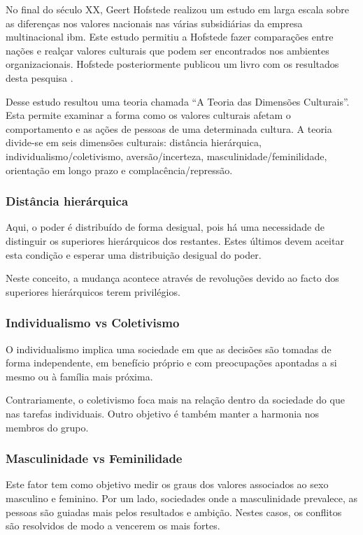 No final do século XX, Geert Hofstede realizou um estudo em larga escala sobre as diferenças nos valores nacionais nas várias subsidiárias da empresa multinacional \acrfull{ibm}. Este estudo permitiu a Hofstede fazer comparações entre nações e realçar valores culturais que podem ser encontrados nos ambientes organizacionais. Hofstede posteriormente publicou um livro com os resultados desta pesquisa  \parencite{Hofstede_1981}.
 
Desse estudo resultou uma teoria chamada “A Teoria das Dimensões Culturais”. Esta permite examinar a forma como os valores culturais afetam o comportamento e as ações de pessoas de uma determinada cultura. A teoria divide-se em seis dimensões culturais: distância hierárquica, individualismo/coletivismo, aversão/incerteza, masculinidade/feminilidade, orientação em longo prazo e complacência/repressão.

\subsubsection{Distância hierárquica}

Aqui, o poder é distribuído de forma desigual, pois há uma necessidade de distinguir os superiores hierárquicos dos restantes. Estes últimos devem aceitar esta condição e esperar uma distribuição desigual do poder.

Neste conceito, a mudança acontece através de revoluções devido ao facto dos superiores hierárquicos terem privilégios.

\subsubsection{Individualismo vs Coletivismo}

O individualismo implica uma sociedade em que as decisões são tomadas de forma independente, em benefício próprio e com preocupações apontadas a si mesmo ou à família mais próxima.

Contrariamente, o coletivismo foca mais na relação dentro da sociedade do que nas tarefas individuais. Outro objetivo é  também manter a harmonia nos membros do grupo.

\subsubsection{Masculinidade vs Feminilidade}

Este fator tem como objetivo medir os graus dos valores associados ao sexo masculino e feminino.
Por um lado, sociedades onde a masculinidade prevalece, as pessoas são guiadas mais pelos resultados e ambição. Nestes casos, os conflitos são resolvidos de modo a vencerem os mais fortes.

